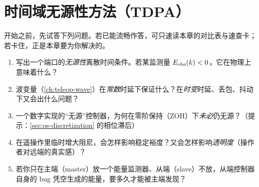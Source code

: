 \chapter{时间域无源性方法（TDPA）}
\label{ch:teleop-tdpa}


\begin{practice}[前置自测]
开始之前，先试答下列问题。若已能流畅作答，可只速读本章的对比表与速查卡；若卡住，正是本章要为你解决的。
\begin{enumerate}
  \item 写出一个端口的\emph{无源性}离散时间条件。若某监测量 $E_{\rm obs}(k)<0$，它在物理上意味着什么？
  \item 波变量（\cref{ch:teleop-wave}）在\emph{常数}时延下保证什么？在\emph{时变}时延、丢包、抖动下又会出什么问题？
  \item 一个数字实现的“无源”控制器，为何在零阶保持（ZOH）下\emph{未必}仍无源？（提示：\cref{sec:os-discretization} 的相位滞后）
  \item 在遥操作里临时增大阻尼，会怎样影响稳定裕度？又会怎样影响\emph{透明度}（操作者对远端的真实感）？
  \item 若你只在主端（master）放一个能量监测器、从端（slave）不放，从端控制器自身的 bug 凭空生成的能量，要多久才能被主端发现？
\end{enumerate}
\end{practice}


